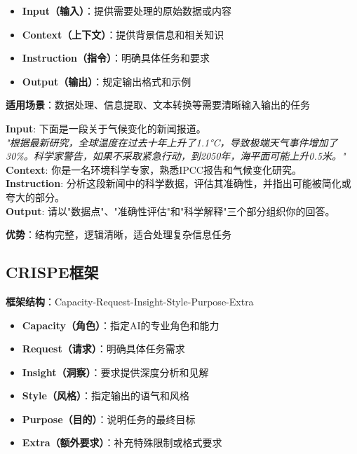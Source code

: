 \documentclass[12pt]{ctexart}
\begin{document}
\begin{itemize}
  \item \textbf{Input（输入）}：提供需要处理的原始数据或内容
  \item \textbf{Context（上下文）}：提供背景信息和相关知识
  \item \textbf{Instruction（指令）}：明确具体任务和要求
  \item \textbf{Output（输出）}：规定输出格式和示例
\end{itemize}

\textbf{适用场景}：数据处理、信息提取、文本转换等需要清晰输入输出的任务

\begin{promptbox}
\textbf{Input}: 下面是一段关于气候变化的新闻报道。\\
\textit{"根据最新研究，全球温度在过去十年上升了1.1°C，导致极端天气事件增加了30\%。科学家警告，如果不采取紧急行动，到2050年，海平面可能上升0.5米。"}\\

\textbf{Context}: 你是一名环境科学专家，熟悉IPCC报告和气候变化研究。\\

\textbf{Instruction}: 分析这段新闻中的科学数据，评估其准确性，并指出可能被简化或夸大的部分。\\

\textbf{Output}: 请以"数据点"、"准确性评估"和"科学解释"三个部分组织你的回答。
\end{promptbox}

\textbf{优势}：结构完整，逻辑清晰，适合处理复杂信息任务

\subsection{CRISPE框架}

\textbf{框架结构}：Capacity-Request-Insight-Style-Purpose-Extra

\begin{itemize}
  \item \textbf{Capacity（角色）}：指定AI的专业角色和能力
  \item \textbf{Request（请求）}：明确具体任务需求
  \item \textbf{Insight（洞察）}：要求提供深度分析和见解
  \item \textbf{Style（风格）}：指定输出的语气和风格
  \item \textbf{Purpose（目的）}：说明任务的最终目标
  \item \textbf{Extra（额外要求）}：补充特殊限制或格式要求
\end{itemize}
\end{document}
